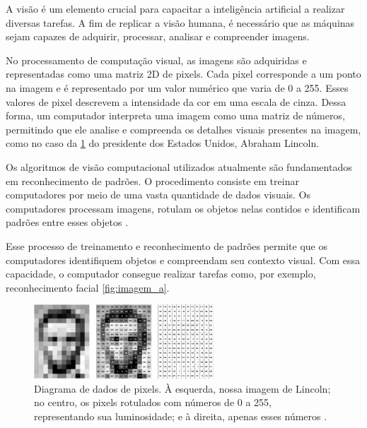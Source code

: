 A visão é um elemento crucial para capacitar a inteligência artificial a realizar diversas tarefas. A fim de replicar a visão humana, é necessário que as máquinas sejam capazes de adquirir, processar, analisar e compreender imagens. \cite{como_funciona_visao_computacional}



No processamento de computação visual, as imagens são adquiridas e representadas como uma matriz 2D de pixels. Cada pixel corresponde a um ponto na imagem e é representado por um valor numérico que varia de 0 a 255. Esses valores de pixel descrevem a intensidade da cor em uma escala de cinza. Dessa forma, um computador interpreta uma imagem como uma matriz de números, permitindo que ele analise e compreenda os detalhes visuais presentes na imagem, como no caso da \cref{fig:comp_vision} do presidente dos Estados Unidos, Abraham Lincoln\cite{mit_video}.

Os algoritmos de visão computacional utilizados atualmente são fundamentados em reconhecimento de padrões. O procedimento consiste em treinar computadores por meio de uma vasta quantidade de dados visuais. Os computadores processam imagens, rotulam os objetos nelas contidos e identificam padrões entre esses objetos \cite{content_Human_Vision}.

Esse processo de treinamento e reconhecimento de padrões permite que os computadores identifiquem objetos e compreendam seu contexto visual. Com essa capacidade, o computador consegue realizar tarefas como, por exemplo, reconhecimento facial \cref{fig:imagem_a}.

\begin{figure}[!ht]
	\centering
	\includegraphics[width=0.6\textwidth]{figures/lincoln_pixel_values.png}
	\caption{Diagrama de dados de pixels. À esquerda, nossa imagem de Lincoln; no centro, os pixels rotulados com números de 0 a 255, representando sua luminosidade; e à direita, apenas esses números \cite{content_Human_Vision}.}
	\label{fig:comp_vision}
\end{figure}



